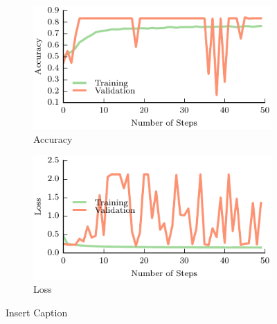 \documentclass[letterpaper, 10 pt]{article}
\begin{document}
\begin{figure}[t!]
    \begin{subfigure}[t]{0.49\textwidth}
        \includegraphics[width=0.99\columnwidth]{figs/accuracy.pdf}
        \caption{Accuracy} \label{fig:accuracy}
        \end{subfigure}
    \begin{subfigure}[t]{0.49\textwidth}
        \includegraphics[width=0.99\columnwidth]{figs/loss.pdf}
        \caption{Loss} \label{fig:loss}
    \end{subfigure}
\caption{Insert Caption} \label{fig:results}
\end{figure}

\end{document}
